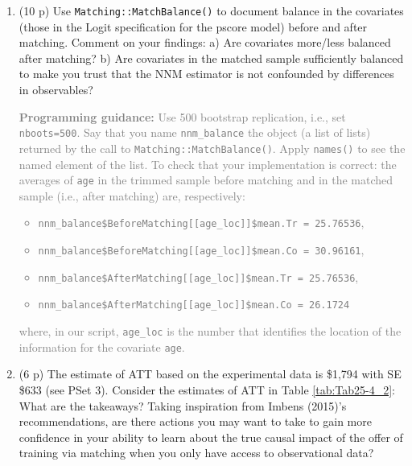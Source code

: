 \documentclass[
]{article}
\providecommand{\tightlist}{%
  \setlength{\itemsep}{0pt}\setlength{\parskip}{0pt}}
\begin{document}
\begin{enumerate}
\def\labelenumi{\arabic{enumi}.}
\setcounter{enumi}{7}
\tightlist
\item
  (10 p) Use \texttt{Matching::MatchBalance()} to document balance in
  the covariates (those in the Logit specification for the pscore model)
  before and after matching. Comment on your findings: a) Are covariates
  more/less balanced after matching? b) Are covariates in the matched
  sample sufficiently balanced to make you trust that the NNM estimator
  is not confounded by differences in observables?

  \textcolor{gray}{\textbf{Programming guidance:} Use 500 bootstrap replication, i.e., set \texttt{nboots=500}. Say that you name \texttt{nnm\_balance} the object (a list of lists) returned by the call to \texttt{Matching::MatchBalance()}. Apply \texttt{names()} to see the named element of the list. To check that your implementation is correct: the averages of \texttt{age} in the trimmed sample before matching and in the matched sample (i.e., after matching) are, respectively:
   \begin{itemize}
   \item \texttt{nnm\_balance\$BeforeMatching[[age\_loc]]\$mean.Tr = 25.76536}, 
   \item \texttt{nnm\_balance\$BeforeMatching[[age\_loc]]\$mean.Co = 30.96161},
   \item \texttt{nnm\_balance\$AfterMatching[[age\_loc]]\$mean.Tr = 25.76536},
   \item \texttt{nnm\_balance\$AfterMatching[[age\_loc]]\$mean.Co = 26.1724}
   \end{itemize}
  where, in our script, \texttt{age\_loc} is the number that identifies the location of the information for the covariate \texttt{age}.}
\item
  (6 p) The estimate of ATT based on the experimental data is \$1,794
  with SE \$633 (see PSet 3). Consider the estimates of ATT in Table
  \ref{tab:Tab25-4_2}: What are the takeaways? Taking inspiration from
  Imbens (2015)'s recommendations, are there actions you may want to
  take to gain more confidence in your ability to learn about the true
  causal impact of the offer of training via matching when you only have
  access to observational data?
\end{enumerate}
\end{document}

